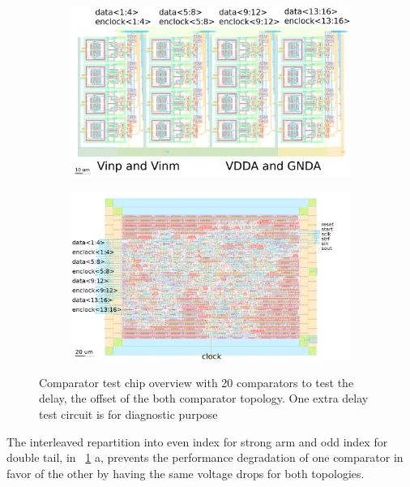 \begin{figure}[htp]
    \centering
    \begin{subfigure}[b]{0.48\textwidth}
        \includegraphics[width=\textwidth]{Chapter5/Figs/comp_test/comparator_analog_offset_layout.png}
    \end{subfigure}
    \begin{subfigure}[b]{0.48\textwidth}
        \includegraphics[width=\textwidth]{Chapter5/Figs/comp_test/comparator_digital_offset_layout.png}
    \end{subfigure}
    \caption{Comparator test chip overview with 20 comparators to test the delay, the offset of the both comparator topology. One extra delay test circuit is for diagnostic purpose}
    \label{fig:comp_offset_layout}
\end{figure}

The interleaved repartition into even index for strong arm and odd index for double tail, in \figurename~\ref{fig:comp_offset_layout} a, prevents the performance degradation of one comparator in favor of the other by having the same voltage drops for both topologies.

